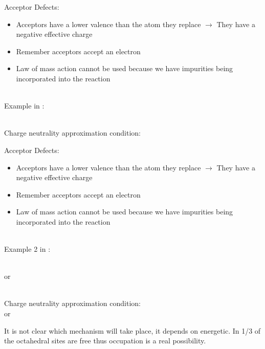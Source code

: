 \documentclass{libs/XJTLU_format}
\begin{document}
\begin{frame}{Acceptor Defects:}

\begin{itemize}
    \item Acceptors have a lower valence than the atom they replace $\rightarrow$ They have a negative effective charge \pause
    \item Remember acceptors accept an electron \pause
    \item Law of mass action cannot be used because we have impurities being incorporated into the reaction \pause
\end{itemize}\\[0.3cm]

Example  in :

\centering
{}\\[6 pt]

\justifying
Charge neutrality approximation condition:\\
\centering
{}

\end{frame}


\begin{frame}{Acceptor Defects:}

\begin{itemize}
    \item Acceptors have a lower valence than the atom they replace $\rightarrow$ They have a negative effective charge
    \item Remember acceptors accept an electron
    \item Law of mass action cannot be used because we have impurities being incorporated into the reaction
\end{itemize}\\[0.3cm]

Example 2  in :

\centering
{}\\[0.1cm]
or\\
\\[6 pt] \pause

\justifying
Charge neutrality approximation condition:\\

\centering
{}
or
\\[6 pt] \pause

\justifying
It is not clear which mechanism will take place, it depends on energetic. In  1/3 of the octahedral sites are free thus occupation is a real possibility. 

\end{frame}
\end{document}
